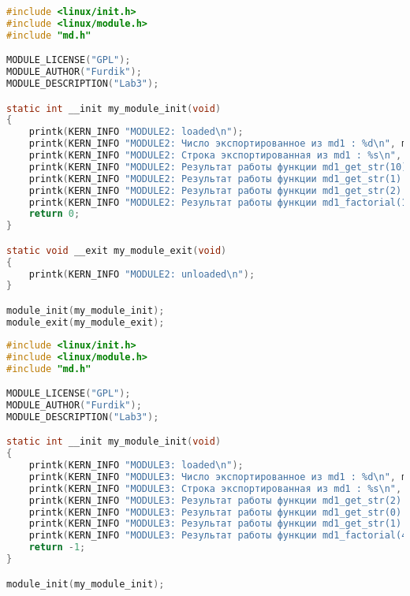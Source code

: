 \begin{lstlisting}[language=c,caption=Листинг кода вызывающего модуля md2]
#include <linux/init.h>
#include <linux/module.h>
#include "md.h"

MODULE_LICENSE("GPL");
MODULE_AUTHOR("Furdik");
MODULE_DESCRIPTION("Lab3");

static int __init my_module_init(void)
{
	printk(KERN_INFO "MODULE2: loaded\n");
	printk(KERN_INFO "MODULE2: Число экспортированное из md1 : %d\n", md1_int_data);
	printk(KERN_INFO "MODULE2: Строка экспортированная из md1 : %s\n", md1_str_data);
	printk(KERN_INFO "MODULE2: Результат работы функции md1_get_str(10) : %s\n", md1_get_str(10));
	printk(KERN_INFO "MODULE2: Результат работы функции md1_get_str(1) : %s\n", md1_get_str(1));
	printk(KERN_INFO "MODULE2: Результат работы функции md1_get_str(2) : %s\n", md1_get_str(2));
	printk(KERN_INFO "MODULE2: Результат работы функции md1_factorial(10) : %d\n", md1_factorial(10));
	return 0;
}

static void __exit my_module_exit(void)
{
	printk(KERN_INFO "MODULE2: unloaded\n");
}

module_init(my_module_init);
module_exit(my_module_exit);


\end{lstlisting}
\begin{lstlisting}[language=c,caption=Листинг кода "отладочного" модуля md3]
#include <linux/init.h>
#include <linux/module.h>
#include "md.h"

MODULE_LICENSE("GPL");
MODULE_AUTHOR("Furdik");
MODULE_DESCRIPTION("Lab3");

static int __init my_module_init(void)
{
	printk(KERN_INFO "MODULE3: loaded\n");
	printk(KERN_INFO "MODULE3: Число экспортированное из md1 : %d\n", md1_int_data);
	printk(KERN_INFO "MODULE3: Строка экспортированная из md1 : %s\n", md1_str_data);
	printk(KERN_INFO "MODULE3: Результат работы функции md1_get_str(2) : %s\n", md1_get_str(10));
	printk(KERN_INFO "MODULE3: Результат работы функции md1_get_str(0) : %s\n", md1_get_str(1));
	printk(KERN_INFO "MODULE3: Результат работы функции md1_get_str(1) : %s\n", md1_get_str(2));
	printk(KERN_INFO "MODULE3: Результат работы функции md1_factorial(4) : %d\n", md1_factorial(10));
	return -1;
}

module_init(my_module_init);


\end{lstlisting}

